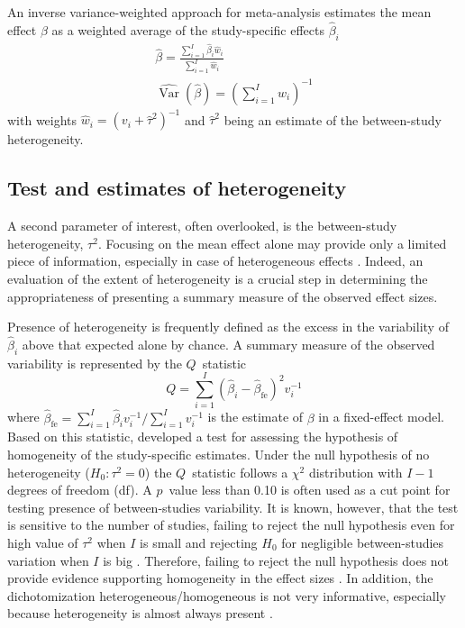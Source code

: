 \documentclass[11pt,a4paper,twoside,openany]{book}\usepackage{knitr}
\DeclareMathOperator{\Var}{Var}
\begin{document}
{{An inverse variance-weighted approach for meta-analysis estimates the mean effect $\beta$ as a weighted average of the study-specific effects $\hat \beta_i$ \citep{whitehead1991general, dersimonian1986meta}
\begin{align}
\hat \beta = \frac{\sum_{i = 1}^I \hat \beta_i \hat w_i}{\sum_{i = 1}^I \hat w_i} \label{eq:avgbeta} \\
\widehat{\Var} \left(\hat \beta \right) = \left( \sum_{i = 1}^I \hat w_i \right)^{-1}
\label{eq:avgvarbeta}
\end{align}
\noindent with weights $\hat w_i = \left(v_i + \hat \tau^2 \right)^{-1}$ and $\hat \tau^2$ being an estimate of the between-study heterogeneity. 


\subsection{Test and estimates of heterogeneity}\label{sec:het_rma}

A second parameter of interest, often overlooked, is the between-study heterogeneity, $\tau^2$. Focusing on the mean effect alone may provide only a limited piece of information, especially in case of heterogeneous effects \citep{borenstein2010basic}. Indeed, an evaluation of the extent of heterogeneity is a crucial step in determining the appropriateness of presenting a summary measure of the observed effect sizes.

Presence of heterogeneity is frequently defined as the excess in the variability of $\hat \beta_i$ above that expected alone by chance. A summary measure of the observed variability is represented by the $Q$~statistic
\begin{equation}
Q = \sum_{i=1}^I \left(\hat \beta_i - \hat \beta_{\text{fe}} \right)^2 v_i^{-1}
\label{eq:Q}
\end{equation}
\noindent where $\hat \beta_{\text{fe}} = \sum_{i=1}^I \hat \beta_i v_i^{-1}/ \sum_{i=1}^I v_i^{-1}$ is the estimate of $\beta$ in a fixed-effect model. Based on this statistic, \cite{cochran1954combination} developed a test for assessing the hypothesis of homogeneity of the study-specific estimates. Under the null hypothesis of no heterogeneity ($H_0: \tau^2 = 0$) the $Q$~statistic follows a $\chi^2$ distribution with $I-1$ degrees of freedom (df). A $p$~value less than 0.10 is often used as a cut point for testing presence of between-studies variability. It is known, however, that the test is sensitive to the number of studies, failing to reject the null hypothesis even for high value of $\tau^2$ when $I$ is small and rejecting $H_0$ for negligible between-studies variation when $I$ is big \citep{higgins2002quantifying, takkouche1999evaluation}. Therefore, failing to reject the null hypothesis does not provide evidence supporting homogeneity in the effect sizes \citep{biggerstaff1997incorporating}. In addition, the dichotomization heterogeneous/homogeneous is not very informative, especially because heterogeneity is almost always present \citep{higgins2008commentary}. 

}}
\end{document}
